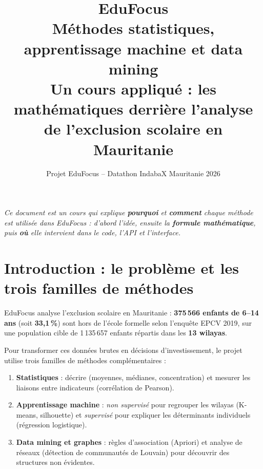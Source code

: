 \documentclass[11pt,a4paper]{article}
\title{\vspace{-1.2cm}
  {\color{eduDark}\textbf{EduFocus}}\\[0.15cm]
  {\Large Méthodes statistiques, apprentissage machine et data mining}\\[0.25cm]
  {\large Un cours appliqué : les mathématiques derrière l'analyse\\ de l'exclusion scolaire en Mauritanie}
}
\author{Projet EduFocus -- Datathon IndabaX Mauritanie 2026}
\date{}
\begin{document}
\maketitle
\vspace{-1.1cm}
\begin{center}
\begin{minipage}{0.92\textwidth}
\small\itshape\color{eduMute}
Ce document est un \emph{cours} qui explique \textbf{pourquoi} et \textbf{comment}
chaque méthode est utilisée dans EduFocus : d'abord l'idée, ensuite la
\textbf{formule mathématique}, puis \textbf{où} elle intervient dans le code,
l'API et l'interface.
\end{minipage}
\end{center}

\tableofcontents
\newpage

\section{Introduction : le problème et les trois familles de méthodes}

EduFocus analyse l'exclusion scolaire en Mauritanie : \textbf{375\,566 enfants
de 6--14 ans} (soit \textbf{33,1\,\%}) sont hors de l'école formelle selon
l'enquête EPCV 2019, sur une population cible de 1\,135\,657 enfants répartis
dans les \textbf{13 wilayas}.

Pour transformer ces données brutes en décisions d'investissement, le projet
utilise trois familles de méthodes complémentaires :

\begin{enumerate}[leftmargin=2.2em]
  \item \textbf{Statistiques} : décrire (moyennes, médianes, concentration) et
        mesurer les liaisons entre indicateurs (corrélation de Pearson).
  \item \textbf{Apprentissage machine} : \emph{non supervisé} pour regrouper
        les wilayas (K-means, silhouette) et \emph{supervisé} pour expliquer
        les déterminants individuels (régression logistique).
  \item \textbf{Data mining et graphes} : règles d'association (Apriori) et
        analyse de réseaux (détection de communautés de Louvain) pour
        découvrir des structures non évidentes.
\end{enumerate}
\end{document}
